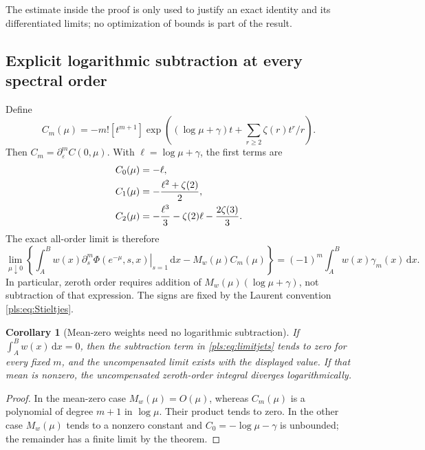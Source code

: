 \documentclass[11pt,letterpaper]{article}
\numberwithin{equation}{section}
\newtheorem{corollary}[theorem]{Corollary}
\theoremstyle{definition}
\theoremstyle{remark}\newtheorem{remark}[theorem]{Remark}
\newcommand{\dd}{\,\mathrm d}
\begin{document}
The estimate inside the proof is only used to justify an exact
identity and its differentiated limits; no optimization of bounds is
part of the result.

\subsection{Explicit logarithmic subtraction at every spectral order}

Define
\begin{equation}\label{pls:eq:Cm}
 C_m(\mu)=-m![t^{m+1}]
   \exp\left((\log\mu+\gamma)t+\sum_{r\ge2}\zeta(r)t^r/r\right).
\end{equation}
Then $C_m=\partial_\varepsilon^mC(0,\mu)$. With
$\ell=\log\mu+\gamma$, the first terms are
\begin{align}
 C_0(\mu)&=-\ell,\notag\\
 C_1(\mu)&=-\frac{\ell^2+\zeta(2)}2,\label{pls:eq:Cexamples}\\
 C_2(\mu)&=-\frac{\ell^3}3-\zeta(2)\ell-\frac{2\zeta(3)}3.
                    \notag
\end{align}
The exact all-order limit is therefore
\begin{equation}\label{pls:eq:limitjets}
 \boxed{\displaystyle
 \lim_{\mu\downarrow0}
 \left\{\int_A^B w(x)
        \left.\partial_s^m\Phi(e^{-\mu},s,x)\right|_{s=1}\dd x
                   -M_w(\mu)C_m(\mu)\right\}
   =(-1)^m\int_A^B w(x)\gamma_m(x)\dd x.}
\end{equation}
In particular, zeroth order requires addition of
$M_w(\mu)(\log\mu+\gamma)$, not subtraction of that expression.
The signs are fixed by the Laurent convention
\eqref{pls:eq:Stieltjes}.

\begin{corollary}[Mean-zero weights need no logarithmic subtraction]
\label{pls:cor:meanzero}
If $\int_A^B w(x)\dd x=0$, then the subtraction term in
\eqref{pls:eq:limitjets} tends to zero for every fixed $m$, and the
uncompensated limit exists with the displayed value. If that mean is
nonzero, the uncompensated zeroth-order integral diverges logarithmically.
\end{corollary}
\begin{proof}
In the mean-zero case $M_w(\mu)=O(\mu)$, whereas $C_m(\mu)$ is
a polynomial of degree $m+1$ in $\log\mu$. Their product tends
to zero. In the other case $M_w(\mu)$ tends to a nonzero constant
and $C_0=-\log\mu-\gamma$ is unbounded; the remainder has a finite
limit by the theorem.
\end{proof}
\end{document}
